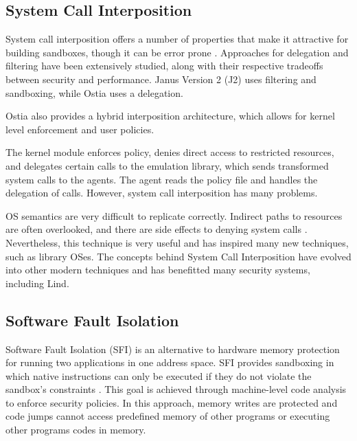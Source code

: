 \subsection{System Call Interposition}

System call interposition offers a number of properties that make it attractive for building sandboxes, though it can be error prone \cite{SCI-04}. Approaches for delegation and filtering have been extensively studied, 
along with their respective tradeoffs between security and performance. 
Janus Version 2 (J2) \cite{Janus0:96, Janus:99} uses filtering and sandboxing, while Ostia \cite{SCI-04} uses a delegation. 

Ostia also provides a hybrid interposition architecture, which allows for kernel level enforcement and user policies. 

The kernel module enforces policy, denies direct access to restricted resources, 
and delegates certain calls to the emulation library, which sends transformed system calls to the agents. 
The agent reads the policy file and handles the delegation of calls. However, system call interposition has many problems.

OS semantics are very difficult to replicate correctly. Indirect paths to resources are often overlooked, 
and there are side effects to denying system calls \cite{Problems-SCI}. 
Nevertheless, this technique is very useful and has inspired many new techniques, such as library OSes. 
The concepts behind System Call Interposition have evolved into other modern techniques 
and has benefitted many security systems, including Lind. 

\subsection{Software Fault Isolation}
Software Fault Isolation (SFI) is an alternative to hardware memory protection for running two applications in one address space. SFI provides sandboxing in which native instructions can only be executed if they do not violate the sandbox's constraints \cite{SFI:93}. This goal is achieved through machine-level code analysis to enforce security policies. In this approach, memory writes are protected and code jumps cannot access predefined memory of other programs or executing other programs codes in memory. 

